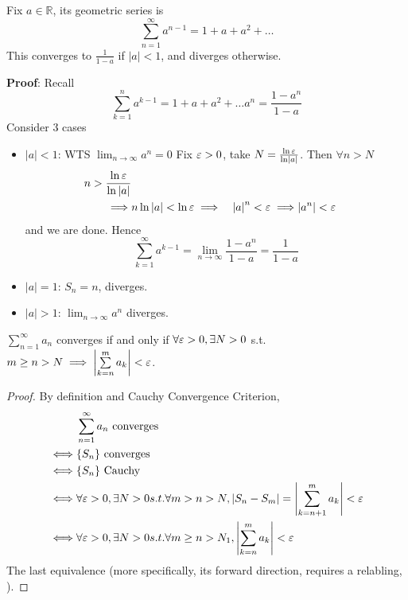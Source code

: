 \begin{example}
    Fix $a \in \mathbb{R}$, its geometric series is 
    \[
    \sum\limits_{n = 1}^{\infty} a^{n-1} = 1 + a + a^{2} + \hdots
    \]
    This converges to $ \frac{1}{1-a}$ if $|a| < 1$, 
    and diverges otherwise.
    \medskip

    \textbf{Proof}: Recall
    \[
        \sum\limits_{k=1}^{n} a^{k-1} 
        = 1 + a + a^{2} + \hdots a^{n}
        = \frac{1-a^{n}}{1-a}
    \]
    Consider 3 cases
    \begin{itemize}
        \item $|a| < 1$: WTS $\lim_{n \to \infty}a^{n} = 0$
        Fix $\varepsilon > 0$, take $N = \frac{\ln \varepsilon}{\ln \left| a \right| }$.
        Then $\forall n > N$
        \begin{align*}
            n > \frac{\ln \varepsilon}{\ln \left| a \right| } \\
            \implies &n \ln \left| a \right|  < \ln \varepsilon
            \implies & \left| a \right|^{n} < \varepsilon
            \implies & |a^{n} | < \varepsilon
        \end{align*}
        and we are done.
        Hence 
        \[
            \sum\limits_{k = 1}^{\infty}  a^{k-1}
            = 
            \lim_{n \to \infty} \frac{1 - a^{n}}{1-a} 
            = \frac{1}{1-a}
        \]
        \item $|a| = 1$: $S_n = n$, diverges.
        \item $|a| > 1$: $\lim_{n \to \infty}a^{n}$ diverges.
    \end{itemize} 
\end{example}

\begin{theorem}
    $\sum\limits_{n = 1}^{\infty} a_n$ converges if and only if
    $\forall \varepsilon >0, \exists N > 0$ s.t. 
    $m \geq n > N \implies \left| \sum\limits_{k = n}^{m} a_k \right| < \varepsilon$.
\end{theorem}

\begin{proof}
    By definition and Cauchy Convergence Criterion,
    \begin{align*}
        & \sum\limits_{n = 1}^{\infty} a_n \text{ converges}  \\
        \iff &  \{ S_n \}  \text{ converges} \\
        \iff & \{ S_n \}  \text{ Cauchy} \\
        \iff & \forall \varepsilon > 0, \exists N > 0 s.t. 
        \forall m > n > N, |S_n - S_m | = 
        \left| \sum\limits_{k = n + 1}^{m} a_k \right| 
        < \varepsilon \\
        \iff & \forall \varepsilon > 0, \exists N > 0 s.t. 
        \forall m \geq n > N_1, 
        \left| \sum\limits_{k = n}^{m} a_k \right| 
        < \varepsilon \\
    \end{align*}
    The last equivalence (more specifically, its forward direction,
    requires a relabling, 
    ).
\end{proof}

